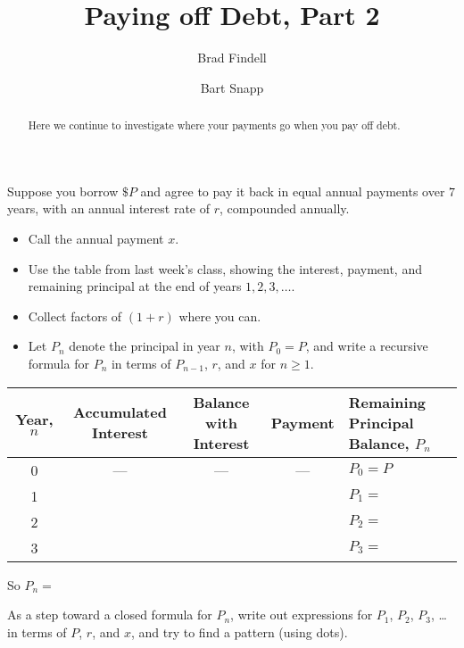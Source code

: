 \documentclass[handout,space,nooutcomes]{ximera}
\title{Paying off Debt, Part 2}
\author{Brad Findell \and Bart Snapp}
\begin{document}
\begin{abstract}
Here we continue to investigate where your payments go when you pay off debt.
\end{abstract}
\maketitle

\begin{question}[1in]
Suppose you borrow $\$P$ and agree to pay it back in equal annual
payments over $7$ years, with an annual interest rate of $r$, compounded annually.  

\begin{itemize}
\item Call the annual payment $x$.
\item Use the table from last week's class, showing the interest, payment, and remaining
principal at the end of years $1, 2, 3, \dots$.  
\item Collect factors of $(1+r)$ where you can.  
\item Let $P_n$ denote the principal in year $n$, with $P_0=P$, and write a recursive formula for $P_n$ in terms of $P_{n-1}$, $r$, and $x$ for $n\ge 1$.  
\end{itemize}




\def\arraystretch{3}
\begin{table}[h]
\begin{tabular}{|c|c|c|c|l|}
\hline
Year, $n$ & Accumulated Interest & Balance with Interest & Payment & Remaining Principal Balance, $P_n$ \\ \hline
0    &   ---    &       ---          &   ---   &  $P_0=P$               \\ \hline
1    &          &                    &         &  $P_1=$                 \\ \hline
2    &          &                    &         &  $P_2=$                  \\ \hline
3    &          &                    &         &  $P_3=$                  \\ \hline
\end{tabular}
\end{table}
\vfill
So $P_n = $
\vfill
\end{question}
\newpage
\begin{question}
As a step toward a closed formula for $P_n$, write out expressions for $P_1$, $P_2$, $P_3$, \dots in terms of $P$, $r$, and $x$, and try to find a pattern (using dots).  
\begin{freeResponse}
\end{freeResponse}
\vfill
\end{question}
\end{document}
